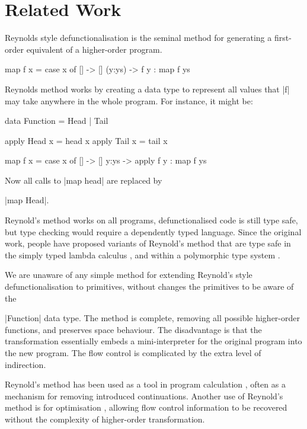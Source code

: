 \documentclass[preprint]{sigplanconf}
\begin{document}
\section{Related Work}
\label{sec:related}

Reynolds style defunctionalisation \cite{reynolds:defunc} is the seminal method for generating a first-order equivalent of a higher-order program.

\begin{example}
\begin{code}
map f x = case  x of
                []      -> []
                (y:ys)  -> f y : map f ys
\end{code}

\noindent Reynolds method works by creating a data type to represent all values that |f| may take anywhere in the whole program. For instance, it might be:

\ignore\begin{code}
data Function = Head | Tail

apply Head  x = head  x
apply Tail  x = tail  x

map f x = case  x of
                []    -> []
                y:ys  -> apply f y : map f ys
\end{code}

\noindent Now all calls to |map head| are replaced by \ignore|map Head|.
\end{example}

Reynold's method works on all programs, defunctionalised code is still type safe, but type checking would require a dependently typed language. Since the original work, people have proposed variants of Reynold's method that are type safe in the simply typed lambda calculus \cite{bell:type_driven_defunctionalization}, and within a polymorphic type system \cite{pottier:polymorhpic_typed_defunctionaization}.

We are unaware of any simple method for extending Reynold's style defunctionalisation to primitives, without changes the primitives to be aware of the \ignore|Function| data type. The method is complete, removing all possible higher-order functions, and preserves space behaviour. The disadvantage is that the transformation essentially embeds a mini-interpreter for the original program into the new program. The flow control is complicated by the extra level of indirection.

Reynold's method has been used as a tool in program calculation \cite{danvy:defunctionalization_at_work,hutton:calculating_an_exceptional_machine}, often as a mechanism for removing introduced continuations. Another use of Reynold's method is for optimisation \cite{grin,jhc}, allowing flow control information to be recovered without the complexity of higher-order transformation.
\end{document}
